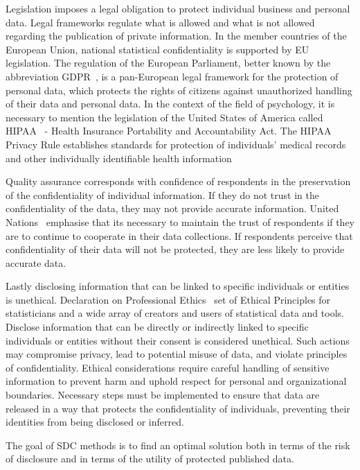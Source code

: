 \documentclass{article}
\begin{document}
Legislation imposes a legal obligation to protect individual business and personal data. Legal frameworks regulate what is allowed and what is not allowed regarding the publication of private information. In the member countries of the European Union, national statistical confidentiality is supported by EU legislation. The regulation of the European Parliament, better known by the abbreviation GDPR~\cite{2016_EU_2016/679}, is a pan-European legal framework for the protection of personal data, which protects the rights of citizens against unauthorized handling of their data and personal data.
In the context of the field of psychology, it is necessary to mention the legislation of the United States of America called HIPAA~\cite{1996_HIPAA} - Health Insurance Portability and Accountability Act.
The HIPAA Privacy Rule establishes standards for protection of individuals' medical records and other individually identifiable health information 

Quality assurance corresponds with confidence of respondents in the preservation of the confidentiality of individual information. If they do not trust in the confidentiality of the data, they may not provide accurate information. United Nations~\cite{2007_UN} emphasise that its necessary to maintain the trust of respondents if they are to continue to cooperate in their data collections. If respondents perceive that confidentiality of their data will not be protected, they are less likely to provide accurate data. 

Lastly disclosing information that can be linked to specific individuals or entities is unethical. Declaration on Professional Ethics~\cite{2010_ISI} set of Ethical Principles for statisticians and a wide array of creators and users of statistical data and tools. 
Disclose information that can be directly or indirectly linked to specific individuals or entities without their consent is considered unethical. Such actions may compromise privacy, lead to potential misuse of data, and violate principles of confidentiality. Ethical considerations require careful handling of sensitive information to prevent harm and uphold respect for personal and organizational boundaries. Necessary steps must be implemented to ensure that data are released in a way that protects the confidentiality of individuals, preventing their identities from being disclosed or inferred.
\newline

The goal of SDC methods is to find an optimal solution both in terms of the risk of disclosure and in terms of the utility of protected published data.
\end{document}
